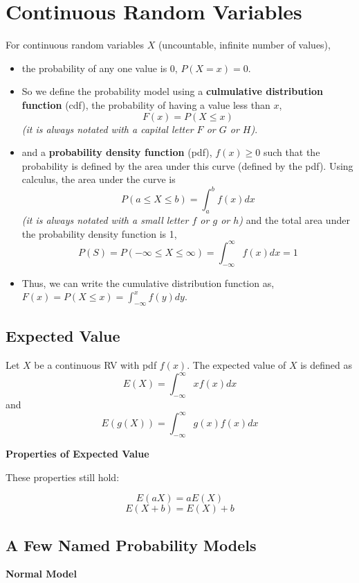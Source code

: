 \documentclass[
]{book}
\begin{document}
\section{Continuous Random Variables}\label{continuous-random-variables}

For continuous random variables \(X\) (uncountable, infinite number of values),

\begin{itemize}
\item
  the probability of any one value is 0, \(P(X = x) = 0\).
\item
  So we define the probability model using a \textbf{culmulative distribution function} (cdf), the probability of having a value less than \(x\),
  \[F(x) = P(X\leq x)\]
  \emph{(it is always notated with a capital letter \(F\) or \(G\) or \(H\))}.
\item
  and a \textbf{probability density function} (pdf), \(f(x)\geq 0\) such that the probability is defined by the area under this curve (defined by the pdf). Using calculus, the area under the curve is
  \[P(a\leq X \leq b) = \int^b_a f(x)dx\]
  \emph{(it is always notated with a small letter \(f\) or \(g\) or \(h\))} and the total area under the probability density function is 1,
  \[P(S) = P(-\infty\leq X\leq \infty) = \int^\infty_{-\infty}f(x)dx = 1\]
\item
  Thus, we can write the cumulative distribution function as, \(F(x) = P(X \leq x) = \int^x_{-\infty} f(y)dy\).
\end{itemize}

\subsection{Expected Value}\label{expected-value-1}

Let \(X\) be a continuous RV with pdf \(f(x)\). The expected value of \(X\) is defined as
\[E(X)= \int^\infty_{-\infty} xf(x)dx \]
and
\[E(g(X))= \int^\infty_{-\infty} g(x)f(x)dx\]

\textbf{Properties of Expected Value}

These properties still hold:

\[ E(aX) =  aE(X)\]
\[E(X+b) = E(X) + b\]

\subsection{A Few Named Probability Models}\label{a-few-named-probability-models-1}

\textbf{Normal Model}
\end{document}
